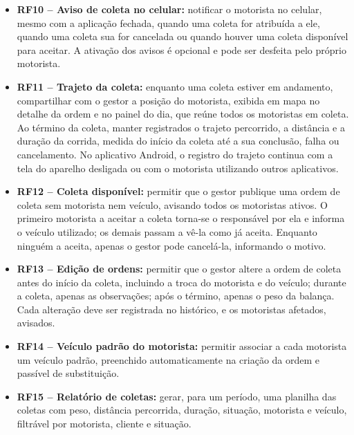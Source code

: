 \begin{itemize}
  \item \textbf{RF10 -- Aviso de coleta no celular:} notificar o motorista no celular, mesmo com a aplicação fechada, quando uma coleta for atribuída a ele, quando uma coleta sua for cancelada ou quando houver uma coleta disponível para aceitar. A ativação dos avisos é opcional e pode ser desfeita pelo próprio motorista.
  \item \textbf{RF11 -- Trajeto da coleta:} enquanto uma coleta estiver em andamento, compartilhar com o gestor a posição do motorista, exibida em mapa no detalhe da ordem e no painel do dia, que reúne todos os motoristas em coleta. Ao término da coleta, manter registrados o trajeto percorrido, a distância e a duração da corrida, medida do início da coleta até a sua conclusão, falha ou cancelamento. No aplicativo Android, o registro do trajeto continua com a tela do aparelho desligada ou com o motorista utilizando outros aplicativos.
  \item \textbf{RF12 -- Coleta disponível:} permitir que o gestor publique uma ordem de coleta sem motorista nem veículo, avisando todos os motoristas ativos. O primeiro motorista a aceitar a coleta torna-se o responsável por ela e informa o veículo utilizado; os demais passam a vê-la como já aceita. Enquanto ninguém a aceita, apenas o gestor pode cancelá-la, informando o motivo.
  \item \textbf{RF13 -- Edição de ordens:} permitir que o gestor altere a ordem de coleta antes do início da coleta, incluindo a troca do motorista e do veículo; durante a coleta, apenas as observações; após o término, apenas o peso da balança. Cada alteração deve ser registrada no histórico, e os motoristas afetados, avisados.
  \item \textbf{RF14 -- Veículo padrão do motorista:} permitir associar a cada motorista um veículo padrão, preenchido automaticamente na criação da ordem e passível de substituição.
  \item \textbf{RF15 -- Relatório de coletas:} gerar, para um período, uma planilha das coletas com peso, distância percorrida, duração, situação, motorista e veículo, filtrável por motorista, cliente e situação.
\end{itemize}


